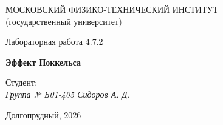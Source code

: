 \thispagestyle{empty}

\begin{center}
    МОСКОВСКИЙ ФИЗИКО-ТЕХНИЧЕСКИЙ ИНСТИТУТ \\
    (государственный университет)
\end{center}

\vfill

\begin{center}
    Лабораторная работа 4.7.2 \\ 
    \vspace{20pt}
    
    \textbf{Эффект Поккельса}
\end{center}  

\vfill

    \noindent Студент: \\
    \textit{Группа № Б01-405 \hfill Сидоров А. Д.}

\vfill

\begin{center}
    Долгопрудный, 2026
\end{center}

